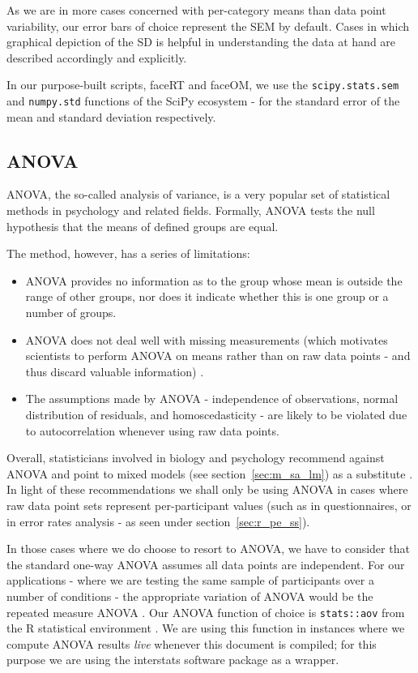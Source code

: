 	    As we are in more cases concerned with per-category means than data point variability, our error bars of choice represent the SEM by default.
	    Cases in which graphical depiction of the SD is helpful in understanding the data at hand are described accordingly and explicitly.
	    
	    In our purpose-built scripts, faceRT\cite{faceRT} and faceOM\cite{faceOM}, we use the \colorbox{vlg}{\texttt{scipy.stats.sem}} and \colorbox{vlg}{\texttt{numpy.std}} functions of the SciPy ecosystem \cite{scipy,Oliphant2007} -
	    for the standard error of the mean and standard deviation respectively.
	\subsection{ANOVA}\label{sec:m_sa_a}
	    ANOVA, the so-called analysis of variance, is a very popular set of statistical methods in psychology and related fields.
	    Formally, ANOVA tests the null hypothesis that the means of defined groups are equal.
	    
	    The method, however, has a series of limitations:
	    \begin{itemize}
		\item ANOVA provides no information as to the group whose mean is outside the range of other groups, nor does it indicate whether this is one group or a number of groups.
		\item ANOVA does not deal well with missing measurements (which motivates scientists to perform ANOVA on means rather than on raw data points - and thus discard valuable information) \cite{Gueorguieva2004}.
		\item The assumptions made by ANOVA - independence of observations, normal distribution of residuals, and homoscedasticity \cite{Anderson1996} - are likely to be violated due to autocorrelation whenever using raw data points. 
	    \end{itemize}
	    Overall, statisticians involved in biology and psychology recommend against ANOVA and point to mixed models (see section~\ref{sec:m_sa_lm}) as a substitute \cite{Baayen2008,Gueorguieva2004}. 
	    In light of these recommendations we shall only be using ANOVA in cases where raw data point sets represent per-participant values 
	    (such as in questionnaires, or in error rates analysis - as seen under section~\ref{sec:r_pe_ss}).
	    
	    In those cases where we do choose to resort to ANOVA, we have to consider that the standard one-way ANOVA assumes all data points are independent.
	    For our applications - where we are testing the same sample of participants over a number of conditions - the appropriate variation of ANOVA would be the repeated measure ANOVA \cite{Gueorguieva2004}.
	    Our ANOVA function of choice is \colorbox{vlg}{\texttt{stats::aov}} \cite{Chambers1992} from the R statistical environment \cite{R}.
	    We are using this function in instances where we compute ANOVA results \textit{live} whenever this document is compiled; for this purpose we are using the interstats\cite{interstats} software package as a wrapper.
	    
